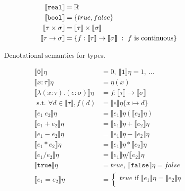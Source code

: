 \begin{figure}
 \begin{align*}
\llbracket \texttt{real} \rrbracket &= \mathbb{R} \\
 \llbracket \texttt{bool} \rrbracket &= {\{true, false\}} \\
 \llbracket \tau \times \sigma \rrbracket &= \llbracket \tau \rrbracket \times \llbracket \sigma \rrbracket  \\
 \llbracket \tau \rightarrow \sigma \rrbracket &= \{f: \llbracket \tau \rrbracket \rightarrow \llbracket \sigma \rrbracket \ : 
 \ f \text{ is continuous}\} \\
 \end{align*}
 \caption{Denotational semantics for types.}
 \label{fig:densemtypes}
 \end{figure}
 \begin{figure}
\begin{align*}
 \llbracket \texttt{0} \rrbracket\eta &= 0, \  \llbracket \texttt{1} \rrbracket\eta = 1, \ \ldots \\
  \llbracket x : \tau \rrbracket\eta &= \eta(x) \\
  \llbracket \lambda (x : \tau) . (e : \sigma) \rrbracket\eta &= f : \llbracket \tau \rrbracket \rightarrow \llbracket \sigma \rrbracket \\
\text{ s.t. } \forall d \in \llbracket \tau \rrbracket, f(d) &= \llbracket e \rrbracket\eta\{ x \mapsto d \} \\
 \llbracket e_1 \ e_2 \rrbracket \eta &= \llbracket e_1 \rrbracket\eta ( \llbracket e_2 \rrbracket\eta ) \\
 \llbracket e_1 + e_2 \rrbracket\eta &= \llbracket e_1 \rrbracket\eta + \llbracket e_2 \rrbracket\eta \\
 \llbracket e_1 - e_2 \rrbracket\eta &= \llbracket e_1 \rrbracket\eta - \llbracket e_2 \rrbracket\eta \\
 \llbracket e_1 * e_2 \rrbracket\eta &= \llbracket e_1 \rrbracket\eta * \llbracket e_2 \rrbracket\eta \\
  \llbracket e_1 / e_2 \rrbracket\eta &= \llbracket e_1 \rrbracket\eta / \llbracket e_2 \rrbracket\eta \\
  \llbracket \texttt{true} \rrbracket\eta &= true, \ \llbracket \texttt{false} \rrbracket\eta = false \\
 \llbracket e_1 = e_2 \rrbracket\eta &= 
 \begin{cases} 
      true \text{ if } \llbracket e_1 \rrbracket\eta = \llbracket e_2 \rrbracket\eta \\

\end{cases}
\end{align*}
\end{figure}
